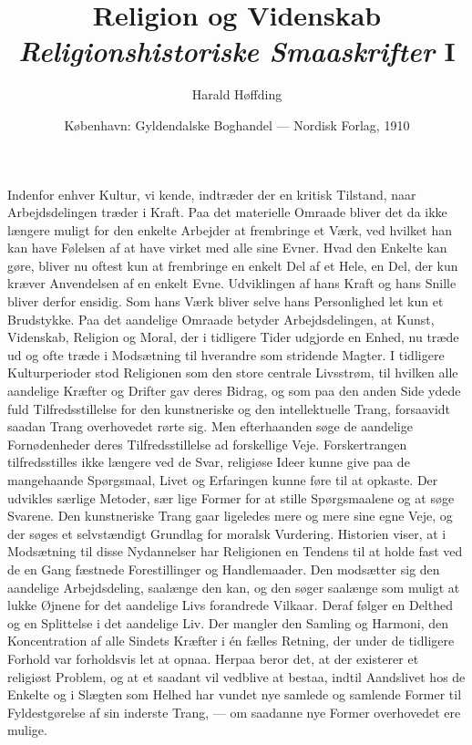 \documentclass[12pt,a4paper]{article}
\title{\textbf{Religion og Videnskab}\\[0.4em]
\large \emph{Religionshistoriske Smaaskrifter} I}
\author{Harald Høffding}
\date{København: Gyldendalske Boghandel --- Nordisk Forlag, 1910}
\newcommand{\opage}[1]{\marginnote{\footnotesize\textit{[#1]}}}
\begin{document}
\maketitle
\thispagestyle{fancy} \opage{1}

\bigskip

\noindent Indenfor enhver Kultur, vi kende, indtræder der en kritisk
Tilstand, naar Arbejdsdelingen træder i Kraft. Paa det materielle
Omraade bliver det da ikke længere muligt for den enkelte Arbejder at
frembringe et Værk, ved hvilket han kan have Følelsen af at have virket
med alle sine Evner. Hvad den Enkelte kan gøre, bliver nu oftest kun at
frembringe en enkelt Del af et Hele, en Del, der kun kræver Anvendelsen
af en enkelt Evne. Udviklingen af hans Kraft og hans Snille bliver
derfor ensidig. Som hans Værk bliver selve hans Personlighed let kun et
Brudstykke. Paa det aandelige Omraade betyder Arbejdsdelingen, at Kunst,
Videnskab, Religion og Moral, der i tidligere Tider udgjorde en Enhed,
nu træde ud og ofte træde i Modsætning til hverandre som stridende
Magter. I tidligere Kulturperioder stod Religionen som den store
centrale Livsstrøm, til hvilken alle aandelige Kræfter og Drifter gav
deres Bidrag, og som paa den anden Side ydede fuld Tilfredsstillelse for
den kunstneriske og den intellektuelle Trang, forsaavidt saadan Trang
overhovedet rørte sig. Men efterhaanden søge de aandelige Fornødenheder
deres Tilfredsstillelse ad forskellige Veje. Forskertrangen
tilfredsstilles ikke længere ved de Svar, religiøse Ideer kunne give paa
de mangehaande Spørgsmaal, Livet og Erfaringen kunne føre til at
opkaste. Der udvikles særlige Metoder, sær%
\opage{2}lige Former for at stille
Spørgsmaalene og at søge Svarene. Den kunstneriske Trang gaar ligeledes
mere og mere sine egne Veje, og der søges et selvstændigt Grundlag for
moralsk Vurdering. Historien viser, at i Modsætning til disse
Nydannelser har Religionen en Tendens til at holde fast ved de en Gang
fæstnede Forestillinger og Handlemaader. Den modsætter sig den aandelige
Arbejdsdeling, saalænge den kan, og den søger saalænge som muligt at
lukke Øjnene for det aandelige Livs forandrede Vilkaar. Deraf følger en
Delthed og en Splittelse i det aandelige Liv. Der mangler den Samling og
Harmoni, den Koncentration af alle Sindets Kræfter i én fælles Retning,
der under de tidligere Forhold var forholdsvis let at opnaa. Herpaa beror
det, at der existerer et religiøst Problem, og at et saadant vil vedblive
at bestaa, indtil Aandslivet hos de Enkelte og i Slægten som Helhed har
vundet nye samlede og samlende Former til Fyldestgørelse af sin inderste
Trang, --- om saadanne nye Former overhovedet ere mulige.
\end{document}
